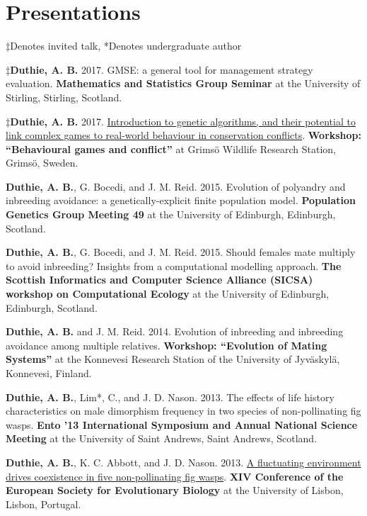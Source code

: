 \documentclass[letterpaper]{article}
\renewenvironment{itemize}{
  \begin{list}{}{
    \setlength{\leftmargin}{1.5em}
  }
}{
  \end{list}
}
\begin{document}
\section*{Presentations}
\begin{itemize}
\item $\ddagger$Denotes invited talk, *Denotes undergraduate author
\item $\ddagger${\bf Duthie, A. B.} 2017. GMSE: a general tool for management strategy evaluation. {\bf Mathematics and Statistics Group Seminar} at the University of Stirling, Stirling, Scotland.
\item $\ddagger${\bf Duthie, A. B.} 2017. \href{https://bradduthie.shinyapps.io/GRIMSO}{Introduction to genetic algorithms, and their potential to link complex games to real-world behaviour in conservation conflicts}. {\bf Workshop: ``Behavioural games and conflict''} at Grims\"{o} Wildlife Research Station, Grims\"{o}, Sweden.
\item {\bf Duthie, A. B.}, G. Bocedi, and J. M. Reid. 2015. Evolution of polyandry and inbreeding avoidance: a genetically-explicit finite population model. {\bf Population Genetics Group Meeting 49} at the University of Edinburgh, Edinburgh, Scotland.
\item {\bf Duthie, A. B.}, G. Bocedi, and J. M. Reid. 2015. Should females mate multiply to avoid inbreeding? Insights from a computational modelling approach. {\bf The Scottish Informatics and Computer Science Alliance (SICSA) workshop on Computational Ecology} at the University of Edinburgh, Edinburgh, Scotland.
\item {\bf Duthie, A. B.} and J. M. Reid. 2014. Evolution of inbreeding and inbreeding avoidance among multiple relatives. {\bf Workshop: ``Evolution of Mating Systems''} at the Konnevesi Research Station of the University of Jyv\"{a}skyl\"{a}, Konnevesi, Finland.
\item {\bf Duthie, A. B.}, Lim*, C., and J. D. Nason. 2013. The effects of life history characteristics on male dimorphism frequency in two species of non-pollinating fig wasps. {\bf Ento '13 International Symposium and Annual National Science Meeting} at the University of Saint Andrews, Saint Andrews, Scotland.
\item {\bf Duthie, A. B.}, K. C. Abbott, and J. D. Nason. 2013. \href{https://www.youtube.com/watch?v=8Oi48FdaLXY}{A fluctuating environment drives coexistence in five non-pollinating fig wasps}. {\bf XIV Conference of the European Society for Evolutionary Biology} at the University of Lisbon, Lisbon, Portugal.

\end{itemize}
\end{document}
